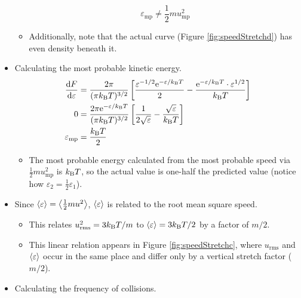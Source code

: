 \documentclass[../notes.tex]{subfiles}
\begin{document}
\begin{itemize}
\begin{itemize}
        \begin{equation*}
            \varepsilon_\text{mp} \neq \frac{1}{2}mu_\text{mp}^2
        \end{equation*}
        \item Additionally, note that the actual curve (Figure \ref{fig:speedStretchd}) has even density beneath it.
    \end{itemize}
    \item Calculating the most probable kinetic energy.
    \begin{align*}
        \dv{F}{\varepsilon} &= \frac{2\pi}{(\pi\kB T)^{3/2}}\left[ \frac{\varepsilon^{-1/2}\e[-\varepsilon/\kB T]}{2}-\frac{\e[-\varepsilon/\kB T]\cdot\varepsilon^{1/2}}{\kB T} \right]\\
        0 &= \frac{2\pi\e[-\varepsilon/\kB T]}{(\pi\kB T)^{3/2}}\left[ \frac{1}{2\sqrt{\varepsilon}}-\frac{\sqrt{\varepsilon}}{\kB T} \right]\\
        \varepsilon_\text{mp} &= \frac{\kB T}{2}
    \end{align*}
    \begin{itemize}
        \item The most probable energy calculated from the most probable speed via $\frac{1}{2}mu_\text{mp}^2$ is $\kB T$, so the actual value is one-half the predicted value (notice how $\varepsilon_2=\frac{1}{2}\varepsilon_1$).
    \end{itemize}
    \item Since $\prb{\varepsilon}=\prb{\frac{1}{2}mu^2}$, $\prb{\varepsilon}$ is related to the root mean square speed.
    \begin{itemize}
        \item This relates $u_\text{rms}^2=3\kB T/m$ to $\prb{\varepsilon}=3\kB T/2$ by a factor of $m/2$.
        \item This linear relation appears in Figure \ref{fig:speedStretchc}, where $u_\text{rms}$ and $\prb{\varepsilon}$ occur in the same place and differ only by a vertical stretch factor ($m/2$).
    \end{itemize}
    \item Calculating the frequency of collisions.
    \begin{figure}[H]
        \centering
\end{figure}
\end{itemize}
\end{document}
